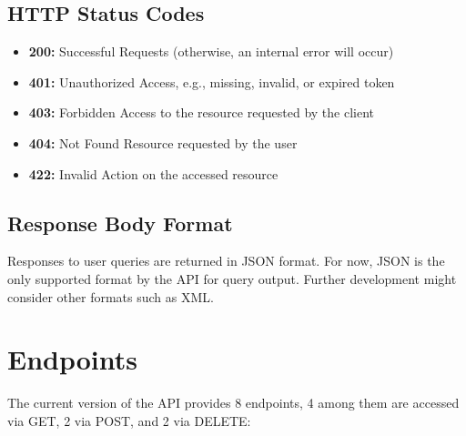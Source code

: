 \documentclass[a4paper,10pt]{scrartcl}
\begin{document}
\subsection{HTTP Status Codes}
\begin{itemize}
 \item \textbf{200:} Successful Requests (otherwise, an internal error will occur)
 \item \textbf{401:} Unauthorized Access, e.g., missing, invalid, or expired token
 \item \textbf{403:} Forbidden Access to the resource requested by the client
 \item \textbf{404:} Not Found Resource requested by the user
 \item \textbf{422:} Invalid Action on the accessed resource
 
\end{itemize}

\subsection{Response Body Format}
Responses to user queries are returned in JSON format. For now, JSON is the only supported format by the API for query output.
Further development might consider other formats such as XML.

\section{Endpoints}
The current version of the API provides 8 endpoints, 4 among them are accessed via GET, 2 via POST, and 2 via DELETE:
\end{document}
